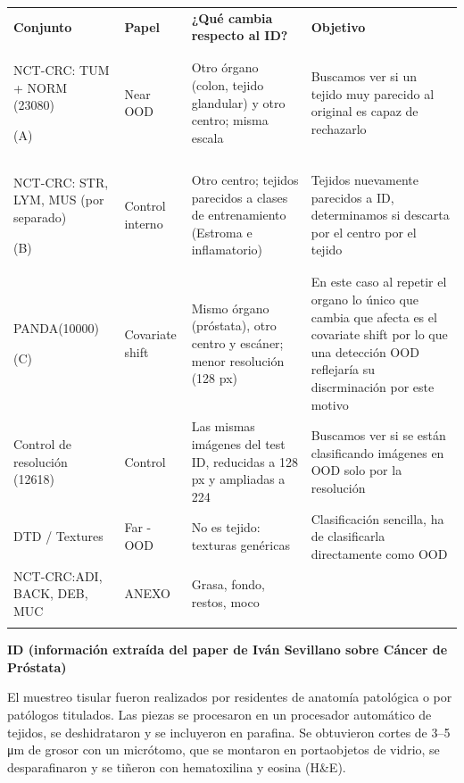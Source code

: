 {\def\LTcaptype{none} %
\begin{longtable}[]{@{}
  >{\raggedright\arraybackslash}p{}
  >{\raggedright\arraybackslash}p{}
  >{\raggedright\arraybackslash}p{}
  >{\raggedright\arraybackslash}p{}@{}}
\toprule\noalign{}
\textbf{Conjunto} & \textbf{Papel} & \textbf{¿Qué cambia respecto al
ID?} & \textbf{Objetivo} \\
NCT-CRC: TUM + NORM (23080)

(A) & Near OOD & Otro órgano (colon, tejido glandular) y otro centro;
misma escala & Buscamos ver si un tejido muy parecido al original es
capaz de rechazarlo \\
NCT-CRC: STR, LYM, MUS (por separado)

(B) & Control interno & Otro centro; tejidos parecidos a clases de
entrenamiento (Estroma e inflamatorio) & Tejidos nuevamente parecidos a
ID, determinamos si descarta por el centro por el tejido \\
PANDA(10000)

(C) & Covariate shift & Mismo órgano (próstata), otro centro y escáner;
menor resolución (128 px) & En este caso al repetir el organo lo único
que cambia que afecta es el covariate shift por lo que una detección OOD
reflejaría su discrminación por este motivo \\
Control de resolución (12618) & Control & Las mismas imágenes del test
ID, reducidas a 128 px y ampliadas a 224 & Buscamos ver si se están
clasificando imágenes en OOD solo por la resolución \\
DTD / Textures & Far -OOD & No es tejido: texturas genéricas &
Clasificación sencilla, ha de clasificarla directamente como OOD \\
NCT-CRC:ADI, BACK, DEB, MUC & ANEXO & Grasa, fondo, restos, moco & \\
\midrule\noalign{}
\endhead
\bottomrule\noalign{}
\endlastfoot
\end{longtable}
}

\textbf{ID (información extraída del paper de Iván Sevillano sobre
Cáncer de Próstata)}

El muestreo tisular fueron realizados por residentes de anatomía
patológica o por patólogos titulados. Las piezas se procesaron en un
procesador automático de tejidos, se deshidrataron y se incluyeron en
parafina. Se obtuvieron cortes de 3--5 μm de grosor con un micrótomo,
que se montaron en portaobjetos de vidrio, se desparafinaron y se
tiñeron con hematoxilina y eosina (H\&E).


